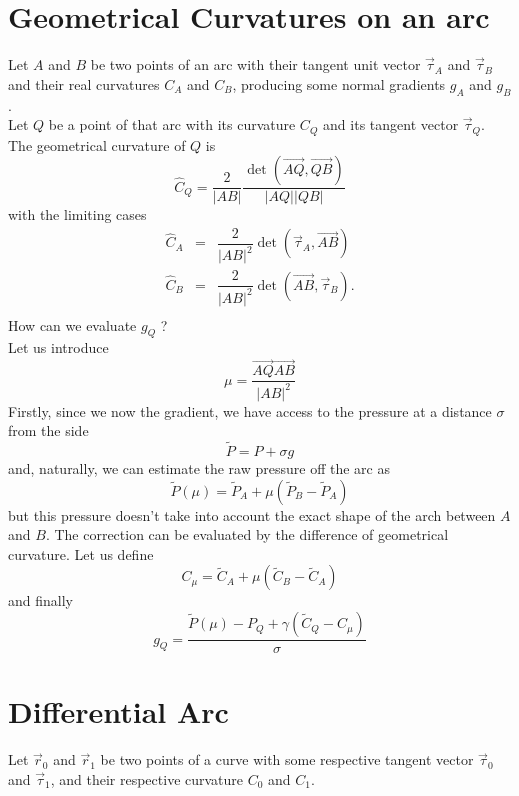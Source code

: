 \documentclass[11pt]{amsart}
\newcommand{\myvec}[1]{\overrightarrow{#1}}
\begin{document}
\section{Geometrical Curvatures on an arc}
Let $A$ and $B$ be two points of an arc with their tangent unit vector $\vec{\tau}_A$
and $\vec{\tau}_B$ and their real curvatures $C_A$ and $C_B$, producing
some normal gradients $g_A$ and $g_B$.\\
Let $Q$ be a point of that arc with its curvature $C_Q$ and its tangent vector $\vec{\tau}_Q$.
The geometrical curvature of $Q$ is
\[
	\hat{C}_Q = \dfrac{2}{|AB|} \dfrac{\det(\myvec{AQ},\myvec{QB})}{|AQ||QB|}
\]
with the limiting cases
\[
	\begin{array}{rcl}
	\hat{C}_A & = & \dfrac{2}{|AB|^2}\det(\vec{\tau}_A,\myvec{AB}) \\
	\hat{C}_B & = & \dfrac{2}{|AB|^2}\det(\myvec{AB},\vec{\tau}_B). \\
	\end{array}
\]
How can we evaluate $g_Q$ ?\\
Let us introduce 
\[
	\mu = \dfrac{\myvec{AQ}\myvec{AB}}{|AB|^2}
\]
Firstly, since we now the gradient, we have access to the pressure
at a distance $\sigma$ from the side
\[
	\tilde{P} = P + \sigma g
\]
and, naturally, we can estimate the raw pressure off the arc as
\[
	\tilde{P}(\mu) = \tilde{P}_A + \mu \left(\tilde{P}_B-\tilde{P}_A\right)
\]
but this pressure doesn't take into account the exact shape of the
arch between $A$ and $B$.
The correction can be evaluated by the difference of geometrical curvature.
Let us define
\[
	C_\mu = \tilde{C}_A + \mu \left(\tilde{C}_B-\tilde{C}_A\right)
\]
and finally
\[
	g_Q = \dfrac{\tilde{P}(\mu)-P_Q + \gamma \left(\tilde{C}_Q - C_\mu\right)}{\sigma}
\]

\section{Differential Arc}
Let $\vec{r}_0$ and $\vec{r}_1$ be two points of a curve
with some respective tangent vector $\vec{\tau}_0$ and $\vec{\tau}_1$, and their
respective curvature $C_0$ and $C_1$.
\end{document}
